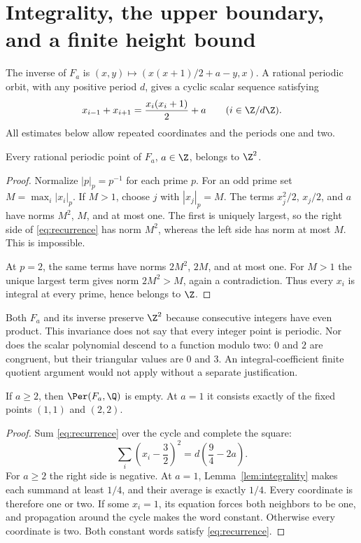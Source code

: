 \section{Integrality, the upper boundary, and a finite height bound}
\label{sec:integrality}

The inverse of $F_a$ is
$(x,y)\mapsto(x(x+1)/2+a-y,x)$.
A rational periodic orbit, with any positive period $d$, gives a
cyclic scalar sequence satisfying
\begin{equation}
 x_{i-1}+x_{i+1}=\frac{x_i(x_i+1)}2+a
 \qquad(i\in\Z/d\Z).
 \label{eq:recurrence}
\end{equation}
All estimates below allow repeated coordinates and the periods one
and two.

\begin{lemma}
\label{lem:integrality}
Every rational periodic point of $F_a$, $a\in\Z$, belongs to $\Z^2$.
\end{lemma}
\begin{proof}
Normalize $|p|_p=p^{-1}$ for each prime $p$.
For an odd prime set $M=\max_i|x_i|_p$. If $M>1$, choose $j$ with
$|x_j|_p=M$. The terms $x_j^2/2$, $x_j/2$, and $a$ have norms
$M^2$, $M$, and at most one. The first is uniquely largest, so the
right side of \eqref{eq:recurrence} has norm $M^2$, whereas the
left side has norm at most $M$. This is impossible.

At $p=2$, the same terms have norms $2M^2$, $2M$, and at most one.
For $M>1$ the unique largest term gives norm $2M^2>M$, again a
contradiction. Thus every $x_i$ is integral at every prime, hence
belongs to $\Z$.
\end{proof}

Both $F_a$ and its inverse preserve $\Z^2$ because consecutive
integers have even product. This invariance does not say that every
integer point is periodic. Nor does the scalar polynomial descend
to a function modulo two: $0$ and $2$ are congruent, but their
triangular values are $0$ and $3$. An integral-coefficient finite
quotient argument would not apply without a separate justification.

\begin{lemma}
\label{lem:upper}
If $a\ge2$, then $\Per(F_a,\Q)$ is empty. At $a=1$ it consists
exactly of the fixed points $(1,1)$ and $(2,2)$.
\end{lemma}
\begin{proof}
Sum \eqref{eq:recurrence} over the cycle and complete the square:
\begin{equation}
 \sum_i\left(x_i-\frac32\right)^2
 =d\left(\frac94-2a\right).
 \label{eq:summed}
\end{equation}
For $a\ge2$ the right side is negative. At $a=1$,
Lemma~\ref{lem:integrality} makes each summand at least $1/4$,
and their average is exactly $1/4$. Every coordinate is therefore
one or two. If some $x_i=1$, its equation forces both neighbors
to be one, and propagation around the cycle makes the word constant.
Otherwise every coordinate is two. Both constant words satisfy
\eqref{eq:recurrence}.
\end{proof}

